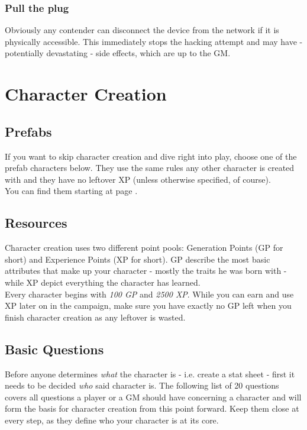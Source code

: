 \documentclass[12pt,a4paper,openany,dvipsnames]{book}
\begin{document}
	\subsection*{Pull the plug}
	Obviously any contender can disconnect the device from the network if it is physically accessible. This immediately stops the hacking attempt and may have - potentially devastating - side effects, which are up to the GM.

	\chapter{Character Creation}
	\section{Prefabs}
	If you want to skip character creation and dive right into play, choose one of the prefab characters below.
	They use the same rules any other character is created with
		and they have no leftover XP (unless otherwise specified, of course).
	\\
	You can find them starting at page \pageref{sec:pfchars}.

	\section{Resources}
	\label{sec:ccResources}
	Character creation uses two different point pools:
		Generation Points (GP for short) and Experience Points (XP for short).
	GP describe the most basic attributes that make up your character - mostly the traits he was born with - while XP depict everything the character has learned.\\
	Every character begins with \emph{100 GP} and \emph{2500 XP}. While you can earn and use XP later on in the campaign, make sure you have exactly no GP left when you finish character creation as any leftover is wasted.

	\section{Basic Questions}
	Before anyone determines \emph{what} the character is - i.e. create a stat sheet - first it needs to be decided \emph{who} said character is. The following list of 20 questions covers all questions a player or a GM should have concerning a character and will form the basis for character creation from this point forward. Keep them close at every step, as they define who your character is at its core.
\end{document}
